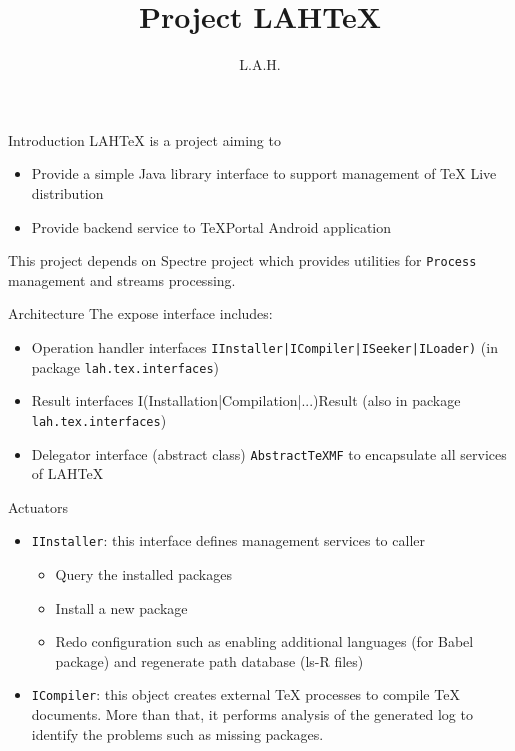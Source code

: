 \documentclass{beamer}
\title{Project LAHTeX}
\author{L.A.H.}
\begin{document}
\begin{frame}
\titlepage
\begin{center}
\end{center}
\end{frame}

\begin{frame}[fragile]{Introduction}
LAHTeX is a project aiming to
\begin{itemize}
\item Provide a simple Java library interface to support management of TeX Live distribution
\item Provide backend service to TeXPortal Android application
\end{itemize}
This project depends on Spectre project which provides utilities for \verb/Process/ management and streams processing.
\end{frame}

\begin{frame}[fragile]{Architecture}
The expose interface includes:
\begin{itemize}
\item Operation handler interfaces \verb/IInstaller|ICompiler|ISeeker|ILoader)/ (in package \verb/lah.tex.interfaces/)
\item Result interfaces I(Installation|Compilation|...)Result (also in package \verb/lah.tex.interfaces/)
\item Delegator interface (abstract class) \verb/AbstractTeXMF/ to encapsulate all services of LAHTeX 
\end{itemize}
\end{frame}

\begin{frame}[fragile]{Actuators}
\begin{itemize}
\item \verb/IInstaller/: this interface defines management services to caller
\begin{itemize}
\item Query the installed packages
\item Install a new package
\item Redo configuration such as enabling additional languages (for Babel package) and regenerate path database (ls-R files)
\end{itemize}
\item \verb/ICompiler/: this object creates external TeX processes to compile TeX documents. More than that, it performs analysis of the generated log to identify the problems such as missing packages. 
\end{itemize}
\end{frame}
\end{document}
